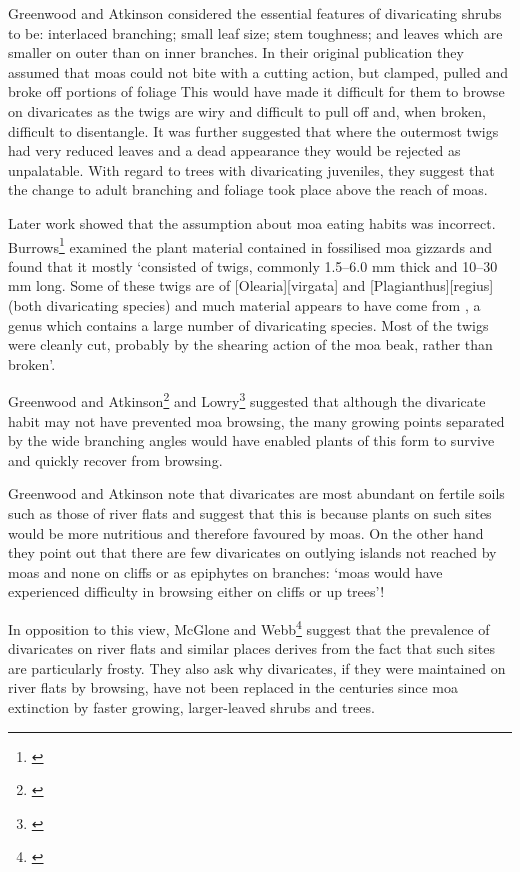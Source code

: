 Greenwood and Atkinson considered the essential features of divaricating shrubs to be: interlaced branching; small leaf size; stem toughness; and leaves which are smaller on outer than on inner branches.
In their original publication they assumed that moas could not bite with a cutting action, but clamped, pulled and broke off portions of foliage This would have made it difficult for them to browse on divaricates as the twigs are wiry and difficult to pull off and, when broken, difficult to disentangle.
It was further suggested that where the outermost twigs had very reduced leaves and a dead appearance they would be rejected as unpalatable.
With regard to trees with divaricating juveniles, they suggest that the change to adult branching and foliage took place above the reach of moas.

Later work showed that the assumption about moa eating habits was incorrect.
Burrows\footnote{\cite{burrows1980moas}} examined the plant material contained in fossilised moa gizzards and found that it mostly `consisted of twigs, commonly 1.5–6.0 mm thick and 10–30 mm long.
Some of these twigs are of [Olearia][virgata] and [Plagianthus][regius] (both divaricating species) and much material appears to have come from , a genus which contains a large number of divaricating species.
Most of the twigs were cleanly cut, probably by the shearing action of the moa beak, rather than broken'.

Greenwood and Atkinson\footnote{\cite{atkinson1980divaricating}} and Lowry\footnote{\cite{lowry1980evolution}} suggested that although the divaricate habit may not have prevented moa browsing, the many growing points separated by the wide branching angles would have enabled plants of this form to survive and quickly recover from browsing.

Greenwood and Atkinson note that divaricates are most abundant on fertile soils such as those of river flats and suggest that this is because plants on such sites would be more nutritious and therefore favoured by moas.
On the other hand they point out that there are few divaricates on outlying islands not reached by moas and none on cliffs or as epiphytes on branches: `moas would have experienced difficulty in browsing either on cliffs or up trees'!

In opposition to this view, McGlone and Webb\footnote{\cite{mcglone1981selective}} suggest that the prevalence of divaricates on river flats and similar places derives from the fact that such sites are particularly frosty.
They also ask why divaricates, if they were maintained on river flats by browsing, have not been replaced in the centuries since moa extinction by faster growing, larger-leaved shrubs and trees.

